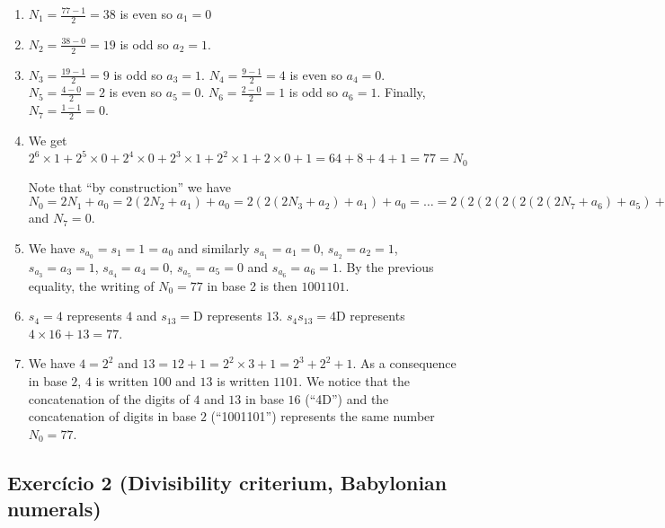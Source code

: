 \begin{enumerate}

\item $N_1 = \frac{77-1}{2} = 38$ is even so $a_1=0$

\item $N_2 = \frac{38 - 0}{2} = 19$ is odd so $a_2=1$.

\item $N_3 = \frac{19-1}{2} = 9$ is odd so $a_3=1$.
  $N_4 = \frac{9-1}{2} = 4$ is even so $a_4=0$.
  $N_5 = \frac{4-0}{2} = 2$ is even so $a_5=0$.
  $N_6 = \frac{2-0}{2} = 1$ is odd so $a_6=1$. Finally,
  $N_7 = \frac{1-1}{2} = 0$.

\item We get
  $${2^6 \times 1} + {2^5 \times 0} + {2^4 \times 0} + {2^3 \times 1}
  + {2^2 \times 1} + {2 \times 0} + 1 = 64+8+4+1=77=N_0$$

  Note that ``by construction'' we have
  $N_0 = 2N_1+a_0 = 2 \left(2N_2+a_1\right) + a_0 =
  2 \left(2\left(2N_3+a_2\right)+a_1\right) + a_0 = \dots =
  2 \left(2\left(2\left(2\left(2\left(2\left(2N_7+a_6\right)+a_5\right)+a_4\right)+a_3\right)+a_2\right)+a_1\right) + a_0 $ and $N_7=0$.

\item We have $s_{a_0} = s_{1} = 1 = a_0$ and similarly
  $s_{a_1} = a_1 = 0$, $s_{a_2} = a_2 = 1$, $s_{a_3} = a_3 = 1$,
  $s_{a_4} = a_4 = 0$, $s_{a_5} = a_5 = 0$ and $s_{a_6} = a_6 = 1$. By the
  previous equality, the writing of $N_0= 77$ in base 2 is then
  $1001101$.

\item $s_4=4$ represents $4$ and  $s_{13}=\text{D}$ represents $13$.
  ${s_4s_{13}}=\text{4D}$ represents
  $4 \times 16 + 13 = 77$.

\item We have $4=2^2$ and
  $13=12+1 = 2^2 \times 3 + 1 = 2^3 + 2^2 + 1$. As a consequence in base $2$,
  $4$ is written $100$ and $13$ is written $1101$. We notice that the
  concatenation of the digits of $4$ and $13$ in base $16$ (``4D'') and the
  concatenation of digits in base $2$ (``1001101'') represents the same
  number $N_0=77$.

\end{enumerate}

\subsection*{Exercício 2 (Divisibility criterium, Babylonian numerals)}

